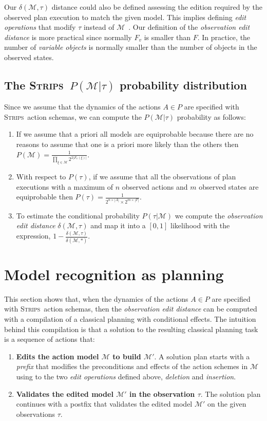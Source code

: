 \documentclass[letterpaper]{article} %
\newcommand{\strips}{\textsc{Strips}}     %
\begin{document}
Our $\delta(\mathcal{M},\tau)$ distance could also be defined assessing the edition required by the observed plan execution to match the given model. This implies defining {\em edit operations} that modify $\tau$ instead of $\mathcal{M}$~\cite{sohrabi:precognition:IJCAI2016}. Our definition of the {\em observation edit distance} is more practical since normally $F_v$ is smaller than $F$. In practice, the number of {\em variable objects} is normally smaller than the number of objects in the observed states.

\subsection{The \strips\ $P(\mathcal{M}|\tau)$ probability distribution}
Since we assume that the dynamics of the actions $A\in P$ are specified with \strips\ action schemas, we can compute the $P(\mathcal{M}|\tau)$ probability as follows:
\begin{enumerate}
\item If we assume that a priori all models are equiprobable because there are no reasons to assume that one is a priori more likely than the others then $P(\mathcal{M})=\frac{1}{\prod_{\xi\in\mathcal{M}} 2^{2|F_v(\xi)|}}$.
\item With respect to $P(\tau)$, if we assume that all the observations of plan executions with a maximum of $n$ observed actions and $m$ observed states are equiprobable then $P(\tau)=\frac{1}{2^{n\times|A|}\times2^{m\times|F|}}$.
\item To estimate the conditional probability $P(\tau|\mathcal{M})$ we compute the {\em observation edit distance} $\delta(\mathcal{M},\tau)$ and map it into a $[0,1]$ likelihood with the expression, $1-\frac{\delta(\mathcal{M},\tau)}{\delta(\mathcal{M},*)}$.
\end{enumerate}



\section{Model recognition as planning}
This section shows that, when the dynamics of the actions $A\in P$ are specified with \strips\ action schemas, then the {\em observation edit distance} can be computed with a compilation of a classical planning with conditional effects. The intuition behind this compilation is that a solution to the resulting classical planning task is a sequence of actions that:
\begin{enumerate}
\item {\bf Edits the action model $\mathcal{M}$ to build $\mathcal{M}'$}. A solution plan starts with a {\em prefix} that modifies the preconditions and effects of the action schemes in $\mathcal{M}$ using to the two {\em edit operations} defined above, {\em deletion} and {\em insertion}. 
\item {\bf Validates the edited model $\mathcal{M}'$ in the observation $\tau$}. The solution plan continues with a postfix that validates the edited model $\mathcal{M}'$ on the given observations $\tau$.
\end{enumerate}
\end{document}
